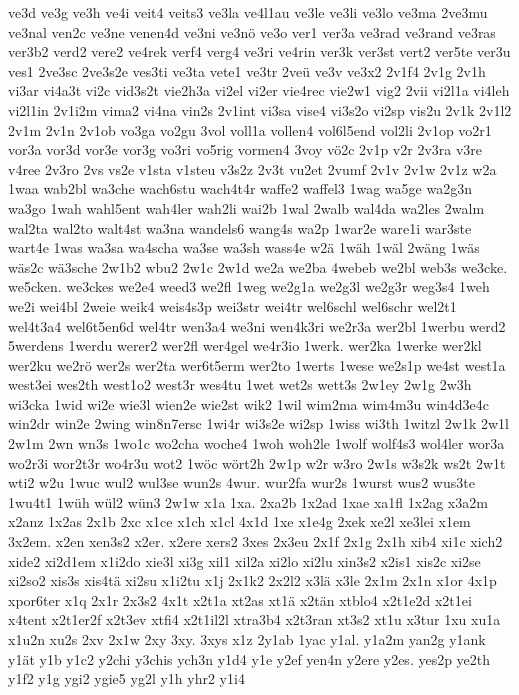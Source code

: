 {ve3d
ve3g
ve3h
ve4i
veit4
veits3
ve3la
ve4l1au
ve3le
ve3li
ve3lo
ve3ma
2ve3mu
ve3nal
ven2c
ve3ne
venen4d
ve3ni
ve3nö
ve3o
ver1
ver3a
ve3rad
ve3rand
ve3ras
ver3b2
verd2
vere2
ve4rek
verf4
verg4
ve3ri
ve4rin
ver3k
ver3st
vert2
ver5te
ver3u
ves1
2ve3sc
2ve3s2e
ves3ti
ve3ta
vete1
ve3tr
2veü
ve3v
ve3x2
2v1f4
2v1g
2v1h
vi3ar
vi4a3t
vi2c
vid3s2t
vie2h3a
vi2el
vi2er
vie4rec
vie2w1
vig2
2vii
vi2l1a
vi4leh
vi2l1in
2v1i2m
vima2
vi4na
vin2s
2v1int
vi3sa
vise4
vi3s2o
vi2sp
vis2u
2v1k
2v1l2
2v1m
2v1n
2v1ob
vo3ga
vo2gu
3vol
voll1a
vollen4
vol6l5end
vol2li
2v1op
vo2r1
vor3a
vor3d
vor3e
vor3g
vo3ri
vo5rig
vormen4
3voy
vö2c
2v1p
v2r
2v3ra
v3re
v4ree
2v3ro
2vs
vs2e
v1sta
v1steu
v3s2z
2v3t
vu2et
2vumf
2v1v
2v1w
2v1z
w2a
1waa
wab2bl
wa3che
wach6stu
wach4t4r
waffe2
waffel3
1wag
wa5ge
wa2g3n
wa3go
1wah
wahl5ent
wah4ler
wah2li
wai2b
1wal
2walb
wal4da
wa2les
2walm
wal2ta
wal2to
walt4st
wa3na
wandels6
wang4s
wa2p
1war2e
ware1i
war3ste
wart4e
1was
wa3sa
wa4scha
wa3se
wa3sh
wass4e
w2ä
1wäh
1wäl
2wäng
1wäs
wäs2c
wä3sche
2w1b2
wbu2
2w1c
2w1d
we2a
we2ba
4webeb
we2bl
web3s
we3cke.
we5cken.
we3ckes
we2e4
weed3
we2fl
1weg
we2g1a
we2g3l
we2g3r
weg3s4
1weh
we2i
wei4bl
2weie
weik4
weis4s3p
wei3str
wei4tr
wel6schl
wel6schr
wel2t1
wel4t3a4
wel6t5en6d
wel4tr
wen3a4
we3ni
wen4k3ri
we2r3a
wer2bl
1werbu
werd2
5werdens
1werdu
werer2
wer2fl
wer4gel
we4r3io
1werk.
wer2ka
1werke
wer2kl
wer2ku
we2rö
wer2s
wer2ta
wer6t5erm
wer2to
1werts
1wese
we2s1p
we4st
west1a
west3ei
wes2th
west1o2
west3r
wes4tu
1wet
wet2s
wett3s
2w1ey
2w1g
2w3h
wi3cka
1wid
wi2e
wie3l
wien2e
wie2st
wik2
1wil
wim2ma
wim4m3u
win4d3e4c
win2dr
win2e
2wing
win8n7ersc
1wi4r
wi3s2e
wi2sp
1wiss
wi3th
1witzl
2w1k
2w1l
2w1m
2wn
wn3s
1wo1c
wo2cha
woche4
1woh
woh2le
1wolf
wolf4s3
wol4ler
wor3a
wo2r3i
wor2t3r
wo4r3u
wot2
1wöc
wört2h
2w1p
w2r
w3ro
2w1s
w3s2k
ws2t
2w1t
wti2
w2u
1wuc
wul2
wul3se
wun2s
4wur.
wur2fa
wur2s
1wurst
wus2
wus3te
1wu4t1
1wüh
wül2
wün3
2w1w
x1a
1xa.
2xa2b
1x2ad
1xae
xa1fl
1x2ag
x3a2m
x2anz
1x2as
2x1b
2xc
x1ce
x1ch
x1cl
4x1d
1xe
x1e4g
2xek
xe2l
xe3lei
x1em
3x2em.
x2en
xen3s2
x2er.
x2ere
xers2
3xes
2x3eu
2x1f
2x1g
2x1h
xib4
xi1c
xich2
xide2
xi2d1em
x1i2do
xie3l
xi3g
xil1
xil2a
xi2lo
xi2lu
xin3s2
x2is1
xis2c
xi2se
xi2so2
xis3s
xis4tä
xi2su
x1i2tu
x1j
2x1k2
2x2l2
x3lä
x3le
2x1m
2x1n
x1or
4x1p
xpor6ter
x1q
2x1r
2x3s2
4x1t
x2t1a
xt2as
xt1ä
x2tän
xtblo4
x2t1e2d
x2t1ei
x4tent
x2t1er2f
x2t3ev
xtfi4
x2t1il2l
xtra3b4
x2t3ran
xt3s2
xt1u
x3tur
1xu
xu1a
x1u2n
xu2s
2xv
2x1w
2xy
3xy.
3xys
x1z
2y1ab
1yac
y1al.
y1a2m
yan2g
y1ank
y1ät
y1b
y1c2
y2chi
y3chis
ych3n
y1d4
y1e
y2ef
yen4n
y2ere
y2es.
yes2p
ye2th
y1f2
y1g
ygi2
ygie5
yg2l
y1h
yhr2
y1i4
}

